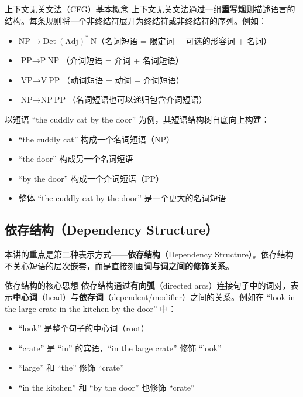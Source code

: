 \documentclass[a4paper]{article}
\begin{document}
\begin{knowledgebox}{上下文无关文法（CFG）基本概念}
上下文无关文法通过一组\textbf{重写规则}描述语言的结构。每条规则将一个非终结符展开为终结符或非终结符的序列。例如：
\begin{itemize}
    \item $\text{NP} \rightarrow \text{Det} \ (\text{Adj})^* \ \text{N}$（名词短语 = 限定词 + 可选的形容词 + 名词）
    \item $\text{PP} \rightarrow \text{P} \ \text{NP}$（介词短语 = 介词 + 名词短语）
    \item $\text{VP} \rightarrow \text{V} \ \text{PP}$（动词短语 = 动词 + 介词短语）
    \item $\text{NP} \rightarrow \text{NP} \ \text{PP}$（名词短语也可以递归包含介词短语）
\end{itemize}
\end{knowledgebox}

以短语 ``the cuddly cat by the door'' 为例，其短语结构树自底向上构建：

\begin{itemize}
    \item ``the cuddly cat'' 构成一个名词短语（NP）
    \item ``the door'' 构成另一个名词短语
    \item ``by the door'' 构成一个介词短语（PP）
    \item 整体 ``the cuddly cat by the door'' 是一个更大的名词短语
\end{itemize}









\subsection{依存结构（Dependency Structure）}

本讲的重点是第二种表示方式——\textbf{依存结构}（Dependency Structure）。依存结构不关心短语的层次嵌套，而是直接刻画\textbf{词与词之间的修饰关系}。

\begin{importantbox}{依存结构的核心思想}
依存结构通过\textbf{有向弧}（directed arcs）连接句子中的词对，表示\textbf{中心词}（head）与\textbf{依存词}（dependent/modifier）之间的关系。例如在 ``look in the large crate in the kitchen by the door'' 中：
\begin{itemize}
    \item ``look'' 是整个句子的中心词（root）
    \item ``crate'' 是 ``in'' 的宾语，``in the large crate'' 修饰 ``look''
    \item ``large'' 和 ``the'' 修饰 ``crate''
    \item ``in the kitchen'' 和 ``by the door'' 也修饰 ``crate''
\end{itemize}
\end{importantbox}
\end{document}
